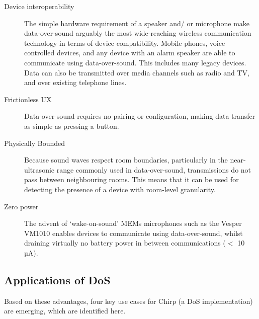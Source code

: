 \documentclass{article}
\begin{document}
\begin{description}
    \item [Device interoperability] The simple hardware requirement of a
        speaker and/ or microphone make data-over-sound arguably the most
        wide-reaching wireless communication technology in terms of device
        compatibility. Mobile phones, voice controlled devices, and any device
        with an alarm speaker are able to communicate using data-over-sound.
        This includes many legacy devices. Data can also be transmitted over
        media channels such as radio and TV, and over existing telephone lines.

    \item [Frictionless UX]  Data-over-sound requires no pairing or
        configuration, making data transfer as simple as pressing a button. 

    \item [Physically Bounded]  Because sound waves respect room boundaries,
        particularly in the near-ultrasonic range commonly used in
        data-over-sound, transmissions do not pass between neighbouring rooms.
        This means that it can be used for detecting the presence of a device
        with room-level granularity.

    \item [Zero power] The advent of ‘wake-on-sound’ MEMs microphones such as
        the Vesper VM1010 enables devices to communicate using data-over-sound,
        whilst draining virtually no battery power in between communications ($<$
        10 µA). 
\end{description}

\subsection{Applications of DoS}

Based on these advantages, four key use cases for Chirp (a DoS implementation) are emerging, which are
identified here.
\end{document}
